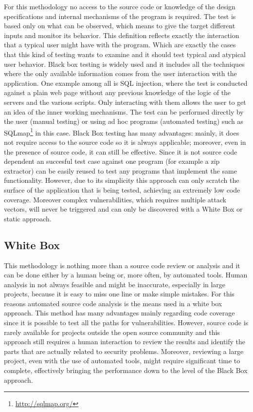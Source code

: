 \documentclass[../main.tex]{subfiles}
\begin{document}
For this methodology no access to the source code or knowledge of the design
specifications and internal mechanisms of the program is required. The test is
based only on what can be observed, which means to give the target different
inputs and monitor its behavior. This definition reflects exactly the
interaction that a typical user might have with the program. Which are exactly
the cases that this kind of testing wants to examine and it should test typical
and atypical user behavior. Black box testing is widely used and it includes all
the techniques where the only available information comes from the user
interaction with the application. One example among all is SQL injection, where
the test is conducted against a plain web page without any previous knowledge of
the logic of the servers and the various scripts. Only interacting with them
allows the user to get an idea of the inner working mechanisms. The test can be
performed directly by the user (manual testing) or using ad hoc programs
(automated testing) such as SQLmap\footnote{\url{http://sqlmap.org/}} in this case.
Black Box testing has many advantages: mainly, it does not require access to the
source code so it is always applicable; moreover, even in the presence of source
code, it can still be effective. Since it is not source code dependent an
succesful test case against one program (for example a zip extractor) can be
easily reused to test any programs that implement the same functionality.
However, due to its simplicity this approach can only scratch the surface of the
application that is being tested, achieving an extremely low code coverage. Moreover complex vulnerabilities, which requires multiple attack vectors, will never be triggered and can only be discovered with a White Box or static approach.

\subsection{White Box}

This methodology is nothing more than a source code review or analysis and it
can be done either by a human being or, more often, by automated tools. Human
analysis in not always feasible and might be inaccurate, especially in large
projects, because it is easy to miss one line or make simple mistakes. For this
reasons automated source code analysis is the means used in a white box approach. This method has many advantages mainly regarding code coverage since it is possible to test all the paths for vulnerabilities. However, source code is rarely available for projects outside the open source community and this approach still requires a human interaction to review the results and identify the parts that are actually related to security problems. Moreover, reviewing a large project, even with the use of automated tools, might require significant time to complete, effectively bringing the performance down to the level of the Black Box approach.
\end{document}

